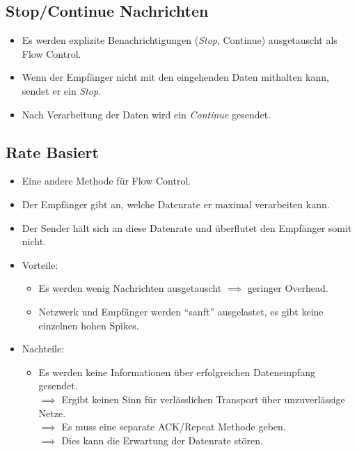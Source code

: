 \documentclass[a4paper, 11pt, accentcolor = tud3b]{tudreport}
\begin{document}
            \subsection{Stop/Continue Nachrichten}
		        \begin{itemize}
		        	\item Es werden explizite Benachrichtigungen (\textit{Stop}, Continue) ausgetauscht als Flow Control.
		        	\item Wenn der Empfänger nicht mit den eingehenden Daten mithalten kann, sendet er ein \textit{Stop}.
		        	\item Nach Verarbeitung der Daten wird ein \textit{Continue} gesendet.
		        \end{itemize}

            \subsection{Rate Basiert}
                \begin{itemize}
                	\item Eine andere Methode für Flow Control.
                	\item Der Empfänger gibt an, welche Datenrate er maximal verarbeiten kann.
                	\item Der Sender hält sich an diese Datenrate und überflutet den Empfänger somit nicht.
                	\item Vorteile:
	                	\begin{itemize}
	                		\item Es werden wenig Nachrichten ausgetauscht \(\implies\) geringer Overhead.
	                		\item Netzwerk und Empfänger werden \enquote{sanft} ausgelastet, es gibt keine einzelnen hohen Spikes.
	                	\end{itemize}
	                \item Nachteile:
		                \begin{itemize}
		                	\item Es werden keine Informationen über erfolgreichen Datenempfang gesendet. \\ \(\implies\) Ergibt keinen Sinn für verlässlichen Transport über unzuverlässige Netze. \\ \(\implies\) Es muss eine separate ACK/Repeat Methode geben. \\ \(\implies\) Dies kann die Erwartung der Datenrate stören.
		                \end{itemize}
                \end{itemize}
\end{document}
